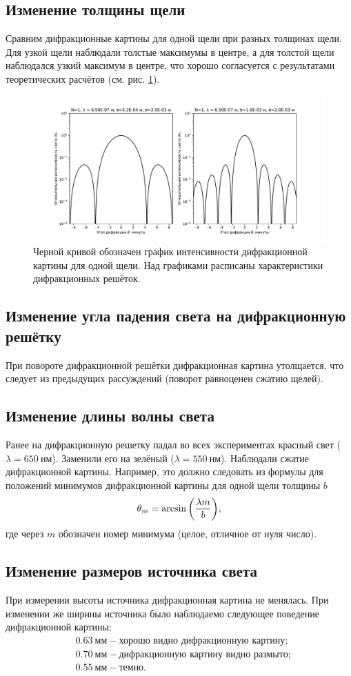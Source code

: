 \documentclass[12pt]{article}
\begin{document}
	\subsection{Изменение толщины щели}
	Сравним дифракционные картины для одной щели при разных толщинах щели. Для узкой щели наблюдали толстые максимумы в центре, а для толстой щели наблюдался узкий максимум в центре, что хорошо согласуется с результатами теоретических расчётов (см. рис. \ref{fig:figure6}).
	\begin{figure}[ht]
		\centering
		\includegraphics[width=0.7\linewidth]{../plots/dif_1_compar_b}
		\caption{Черной кривой обозначен график интенсивности дифракционной картины для одной щели. Над графиками расписаны характеристики дифракционных решёток.}
		\label{fig:figure6}
	\end{figure}

	\subsection{Изменение угла падения света на дифракционную решётку}
	При повороте дифракционной решётки дифракционная картина утолщается, что следует из предыдущих рассуждений (поворот равноценен сжатию щелей).

	\subsection{Изменение длины волны света}
	Ранее на дифракционную решетку падал во всех экспериментах красный свет ($\lambda = 650\ \text{нм}$). Заменили его на зелёный ($\lambda = 550\ \text{нм}$). Наблюдали сжатие дифракционной картины. Например, это должно следовать из формулы для положений минимумов дифракционной картины для одной щели толщины $b$
	\begin{equation}
		\theta_m = \arcsin\qty(\dfrac{\lambda m}{b}),
	\end{equation}
	где через $m$ обозначен номер минимума (целое, отличное от нуля число).

	\subsection{Изменение размеров источника света}
	При измерении высоты источника дифракционная картина не менялась. При изменении же ширины источника было наблюдаемо следующее поведение дифракционной картины:
	\begin{equation*}
	\begin{split}
		&0.63\ \text{мм} - \text{хорошо видно дифракционную картину;}\\
		&0.70\ \text{мм} - \text{дифракционную картину видно размыто;}\\
		&0.55\ \text{мм} - \text{темно.}
	\end{split}
	\end{equation*}
\end{document}
